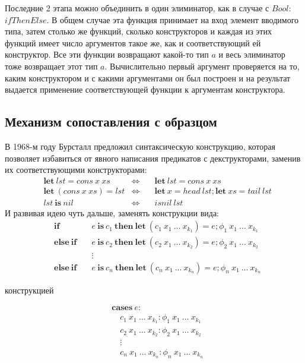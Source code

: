 Последние 2 этапа можно объединить в один элиминатор, как в случае с \(Bool\):
\(ifThenElse\). В общем случае эта функция принимает на вход элемент вводимого
типа, затем столько же функций, сколько конструкторов и каждая из этих функций
имеет число аргументов такое же, как и соответствующий ей конструктор. Все эти
функции возвращают какой-то тип \(a\) и весь элиминатор тоже возвращает этот тип \(a\).
Вычислительно первый аргумент проверяется на то, каким конструктором и с какими
аргументами он был построен и на результат выдается применение соответствующей
функции к аргументам конструктора.

\subsection{Механизм сопоставления с образцом}

В 1968-м году Бурсталл \cite{proving-properties-of-programs-by-structural-induction}
предложил синтаксическую конструкцию, которая позволяет избавиться от явного написания
предикатов с декструкторами, заменив их соответствующими конструкторами:
\begin{align*}
&\mathbf{let}\ lst = cons\ x\ xs &\Leftrightarrow &\quad\mathbf{let}\ lst = cons\ x\ xs\\
&\mathbf{let}\ (cons\ x\ xs) = lst &\Leftrightarrow
   &\quad\mathbf{let}\ x = head\ lst; \mathbf{let}\ xs = tail\ lst\\
&lst\ \mathbf{is}\ nil &\Leftrightarrow &\quad isnil\ lst
\end{align*}
И развивая идею чуть дальше, заменять конструкции вида:
\begin{align*}
&\mathbf{if}\ &&e\ \mathbf{is}\ c_1\ \mathbf{then\ let}\ (c_1\ x_1\ \dots\ x_{k_1}) = e;
   \phi_1\ x_1\ \dots\ x_{k_1}\\
&\mathbf{else\ if}\ &&e\ \mathbf{is}\ c_2\ \mathbf{then\ let}\ (c_2\ x_1\ \dots\ x_{k_2}) = e;
   \phi_2\ x_1\ \dots\ x_{k_2}\\
&&&\vdots\\
&\mathbf{else\ if}\ &&e\ \mathbf{is}\ c_n\ \mathbf{then\ let}\ (c_n\ x_1\ \dots\ x_{k_n}) = e;
   \phi_n\ x_1\ \dots\ x_{k_n}
\end{align*}

конструкцией

\begin{align*}
&\mathbf{cases}\ e:\\
&\quad c_1\ x_1\ \dots\ x_{k_1}: \phi_1\ x_1\ \dots\ x_{k_1}\\
&\quad c_2\ x_1\ \dots\ x_{k_2}: \phi_2\ x_1\ \dots\ x_{k_2}\\
&\quad\vdots\\
&\quad c_n\ x_1\ \dots\ x_{k_n}: \phi_n\ x_1\ \dots\ x_{k_n}
\end{align*}

